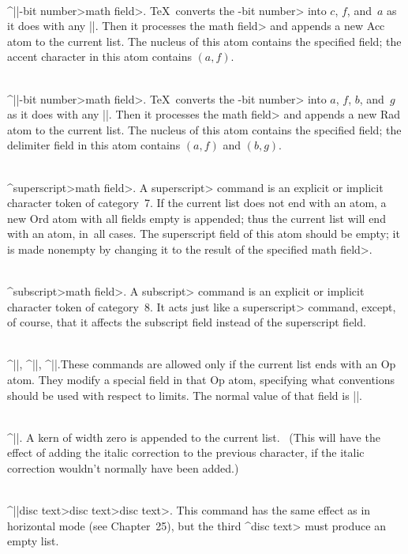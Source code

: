 \\^|\mathaccent|-bit number>\<math field>.\enskip
\TeX\ converts the -bit number> into $c$, $f$, and~$a$ as it does
with any |\mathchar|. Then it processes the \<math field> and appends a
new Acc atom to the current list. The nucleus of this atom contains
the specified field; the accent character in this atom contains $(a,f)$.

\\^|\radical|-bit number>\<math field>.\enskip
\TeX\ converts the -bit number> into $a$, $f$, $b$, and~$g$ as it does
with any |\delimiter|. Then it processes the \<math field> and appends a
new Rad atom to the current list. The nucleus of this atom contains
the specified field; the delimiter field in this atom contains
$(a,f)$ and $(b,g)$.

\\^\<superscript>\<math field>.\enskip
A \<superscript> command is an explicit or implicit character token of
category~7.  If the current list does not end with an atom, a new Ord atom
with all fields empty is appended; thus the current list will end with an
atom, in~all cases.  The superscript field of this atom should be empty; it
is made nonempty by changing it to the result of the specified \<math field>.

\\^\<subscript>\<math field>.\enskip
A \<subscript> command is an explicit or implicit character token of
category~8.  It acts just like a \<superscript> command, except, of course,
that it affects the subscript field instead of the superscript field.

\\^|\displaylimits|, ^|\limits|, ^|\nolimits|.\enskip These commands are
allowed only if the current list ends with an Op atom. They modify a
special field in that Op atom, specifying what conventions should be used
with respect to limits.  The normal value of that field is |\displaylimits|.

\\^|\/|.\enskip
A kern of width zero is appended to the current list. \ (This will have the
effect of adding the italic correction to the previous character, if the
italic correction wouldn't normally have been added.)

\\^|\discretionary|\<disc text>\<disc text>\<disc text>.
This command has the same effect as in horizontal mode (see Chapter~25), but the
third ^{\<disc text>} must produce an empty list.

